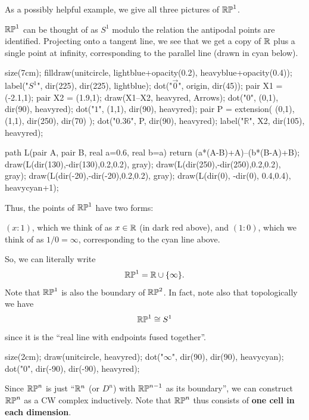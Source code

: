 As a possibly helpful example, we give all three pictures of $\mathbb{RP}^1$.
\begin{example}
	$\mathbb{RP}^1$ can be thought of as $S^1$ modulo the relation
	the antipodal points are identified.
	Projecting onto a tangent line, we see that we get
	a copy of $\mathbb R$ plus a single point at infinity, corresponding
	to the parallel line (drawn in cyan below).
	\begin{center}
		\begin{asy}
			size(7cm);
			filldraw(unitcircle, lightblue+opacity(0.2), heavyblue+opacity(0.4));
			label("$S^1$", dir(225), dir(225), lightblue);
			dot("$\vec 0$", origin, dir(45));
			pair X1 = (-2.1,1);
			pair X2 = (1.9,1);
			draw(X1--X2, heavyred, Arrows);
			dot("$0$", (0,1), dir(90), heavyred);
			dot("$1$", (1,1), dir(90), heavyred);
			pair P = extension( (0,1), (1,1), dir(250), dir(70) );
			dot("$0.36$", P, dir(90), heavyred);
			label("$\mathbb R$", X2, dir(105), heavyred);

			path L(pair A, pair B, real a=0.6, real b=a)
				{ return (a*(A-B)+A)--(b*(B-A)+B); }
			draw(L(dir(130),-dir(130),0.2,0.2), gray);
			draw(L(dir(250),-dir(250),0.2,0.2), gray);
			draw(L(dir(-20),-dir(-20),0.2,0.2), gray);
			draw(L(dir(0), -dir(0), 0.4,0.4), heavycyan+1);
		\end{asy}
	\end{center}

	Thus, the points of $\mathbb{RP}^1$ have two forms:
	\begin{itemize}
		\ii $(x:1)$, which we think of as $x \in \mathbb R$ (in dark red above), and
		\ii $(1:0)$, which we think of as $1/0 = \infty$,
		corresponding to the cyan line above.
	\end{itemize}
	So, we can literally write
	\[ \mathbb{RP}^1 = \mathbb R \cup \{\infty\}. \]
	Note that $\mathbb{RP}^1$ is also the boundary of $\mathbb{RP}^2$.
	In fact, note also that topologically we have
	\[ \mathbb{RP}^1 \cong S^1 \]
	since it is the ``real line with endpoints fused together''.
	\begin{center}
		\begin{asy}
			size(2cm);
			draw(unitcircle, heavyred);
			dot("$\infty$", dir(90), dir(90), heavycyan);
			dot("$0$", dir(-90), dir(-90), heavyred);
		\end{asy}
	\end{center}
\end{example}

Since $\mathbb{RP}^n$ is just ``$\mathbb R^n$ (or $D^n$) with $\mathbb{RP}^{n-1}$ as its boundary'',
we can construct $\mathbb{RP}^n$ as a CW complex inductively.
Note that $\mathbb{RP}^n$ thus consists of \textbf{one cell in each dimension}.

